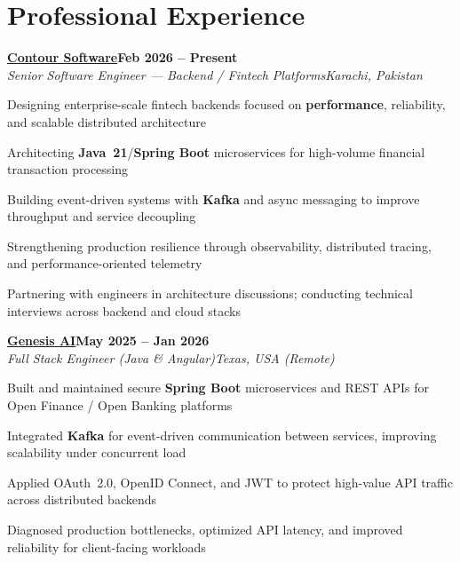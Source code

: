 \documentclass[letterpaper,10pt]{article}
\newcommand{\heading}[2]{
  \hspace{8pt}#1\hfill#2\\
}
\newcommand{\headingBf}[2]{
  \heading{\textbf{#1}}{\textbf{#2}}
}
\newcommand{\headingIt}[2]{
  \heading{\textit{#1}}{\textit{#2}}
}
\newenvironment{resume_list}{
  \vspace{-6pt}
  \begin{itemize}[itemsep=-1px, parsep=0.5pt, topsep=1pt, leftmargin=22pt]
}{
  \end{itemize}
  \vspace{-2pt}
}
\begin{document}
\section{Professional Experience}

\headingBf{\href{https://contour-software.com/}{Contour Software}}{Feb 2026 -- Present}
\headingIt{Senior Software Engineer --- Backend / Fintech Platforms}{Karachi, Pakistan}
\begin{resume_list}
  \item Designing enterprise-scale fintech backends focused on \textbf{performance}, reliability, and scalable distributed architecture
  \item Architecting \textbf{Java~21}/\textbf{Spring Boot} microservices for high-volume financial transaction processing
  \item Building event-driven systems with \textbf{Kafka} and async messaging to improve throughput and service decoupling
  \item Strengthening production resilience through observability, distributed tracing, and performance-oriented telemetry
  \item Partnering with engineers in architecture discussions; conducting technical interviews across backend and cloud stacks
\end{resume_list}

\vspace{2pt}
\headingBf{\href{https://www.linkedin.com/company/genesisaico/}{Genesis AI}}{May 2025 -- Jan 2026}
\headingIt{Full Stack Engineer (Java \& Angular)}{Texas, USA (Remote)}
\begin{resume_list}
  \item Built and maintained secure \textbf{Spring Boot} microservices and REST APIs for Open Finance / Open Banking platforms
  \item Integrated \textbf{Kafka} for event-driven communication between services, improving scalability under concurrent load
  \item Applied OAuth~2.0, OpenID Connect, and JWT to protect high-value API traffic across distributed backends
  \item Diagnosed production bottlenecks, optimized API latency, and improved reliability for client-facing workloads
\end{resume_list}
\end{document}
